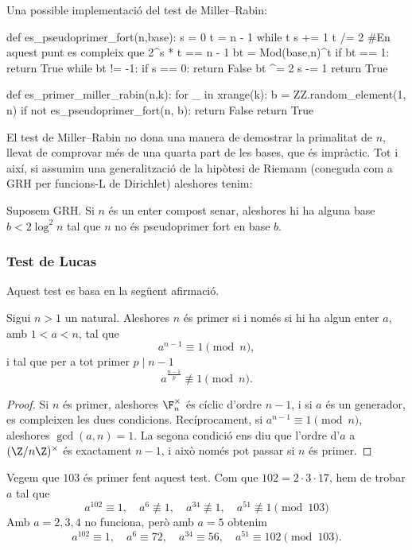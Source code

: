 Una possible implementació del test de Miller--Rabin:
\begin{python}
def es_pseudoprimer_fort(n,base):
    s = 0
    t = n - 1
    while t %
        s += 1
        t /= 2
    #En aquest punt es compleix que 2^s * t == n - 1
    bt = Mod(base,n)^t
    if bt == 1:
        return True
    while bt != -1:
        if s == 0:
            return False 
        bt ^= 2
        s -= 1
    return True

def es_primer_miller_rabin(n,k):
    for _ in xrange(k):
        b = ZZ.random_element(1, n)
        if not es_pseudoprimer_fort(n, b):
            return False
    return True
\end{python}
El test de Miller--Rabin no dona una manera de demostrar la primalitat de $n$, llevat de comprovar més de una quarta part de les bases, que és impràctic. Tot i així, si assumim una generalització de la hipòtesi de Riemann (coneguda com a GRH per funcions-L de Dirichlet) aleshores tenim:
 \begin{proposition}
  Suposem GRH. Si $n$ és un enter compost senar, aleshores hi ha alguna base $b<2\log^2n$ tal que $n$ no és pseudoprimer fort en base $b$.
 \end{proposition}
 \subsubsection{Test de Lucas}
 Aquest test es basa en la següent afirmació.
 \begin{proposition}
  Sigui $n>1$ un natural. Aleshores $n$ és primer si i només si hi ha algun enter $a$, amb $1<a<n$, tal que
  \[
  a^{n-1}\equiv 1\pmod n,
  \]
  i tal que per a tot primer $p\mid n-1$
  \[
  a^{\frac{n-1}{p}}\not\equiv 1 \pmod n.
  \]
 \end{proposition}
 \begin{proof}
Si $n$ és primer, aleshores $\F_n^\times$ és cíclic d'ordre $n-1$, i si $a$ és un generador, es compleixen les dues condicions. Recíprocament, si $a^{n-1}\equiv 1\pmod n$, aleshores $\gcd(a,n) =1$. La segona condició ens diu que l'ordre d'$a$ a $(\Z/n\Z)^\times$ és exactament $n-1$, i això només pot passar si $n$ és primer.
 \end{proof}
 
\begin{example}
 Vegem que $103$ és primer fent aquest test. Com que $102=2\cdot 3\cdot 17$, hem de trobar $a$ tal que
 \[
 a^{102}\equiv 1,\quad a^{6}\not\equiv 1 ,\quad a^{34}\not\equiv 1,\quad a^{51}\not\equiv 1\pmod{103}
 \]
 Amb $a=2,3,4$ no funciona, però amb $a=5$ obtenim
 \[
 a^{102}\equiv 1,\quad a^{6}\equiv 72,\quad a^{34}\equiv 56,\quad a^{51}\equiv 102\pmod{103}.
 \]
\end{example}

